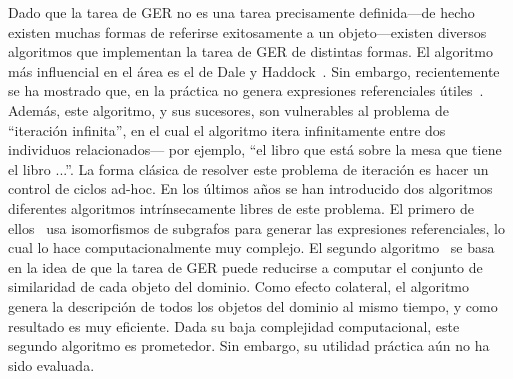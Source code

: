 Dado que la tarea de GER no es una tarea precisamente definida---de hecho existen muchas formas de referirse exitosamente a un objeto---existen diversos algoritmos que implementan la tarea de GER de distintas formas. El algoritmo m\'as influencial en el \'area es el de Dale y Haddock~\cite{DaleRobertandHaddock1991}. Sin embargo, recientemente se ha mostrado que, en la pr\'actica no genera expresiones referenciales \'utiles~\cite{Dale2009}. Adem\'as, este algoritmo, y sus sucesores, son vulnerables al problema de ``iteraci\'on infinita'', en el cual el algoritmo itera infinitamente entre dos individuos relacionados--- por ejemplo, ``el libro que est\'a sobre la mesa que tiene el libro ...''.  La forma cl\'asica de resolver este problema de iteraci\'on es hacer un control de ciclos ad-hoc. En los \'ultimos a\~nos se han introducido dos algoritmos diferentes algoritmos intr\'insecamente libres de este problema. El primero de ellos~\cite{Krahmer2003} usa isomorfismos de subgrafos para generar las expresiones referenciales, lo cual lo hace computacionalmente muy complejo. El segundo algoritmo~\cite{Areces2008} se basa en la idea de que la tarea de GER puede reducirse a computar el conjunto de similaridad de cada objeto del dominio. Como efecto colateral, el algoritmo genera la descripci\'on de todos los objetos del dominio al mismo tiempo, y como resultado es muy eficiente. Dada su baja complejidad computacional, este segundo algoritmo es prometedor. Sin embargo, su utilidad pr\'actica a\'un no ha sido evaluada.  


   




 

